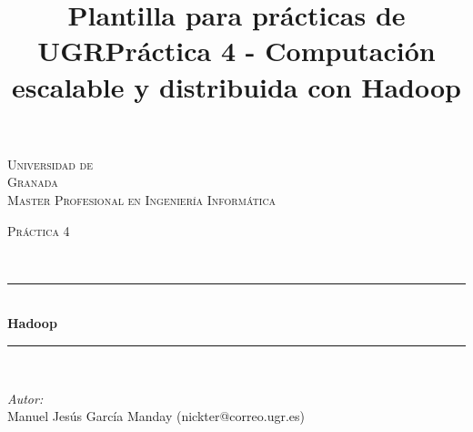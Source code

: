 \documentclass[10pt]{article}
\title{Plantilla para prácticas de UGR}
\title{Práctica 4 - Computación escalable y distribuida con Hadoop}
\begin{document}
\begin{center}																		%
\newcommand{\HRule}{\rule{\linewidth}{0.5mm}}									%
\begin{minipage}{0.48\textwidth} \begin{flushleft}
\end{flushleft}\end{minipage}
\begin{minipage}{0.48\textwidth} \begin{flushright}
\end{flushright}\end{minipage}

\vspace*{-1.5cm}								%
\textsc{\huge Universidad de\\ \vspace{5px} Granada}\\[1.5cm]	

\textsc{\LARGE Master Profesional en Ingenier\'ia Inform\'atica }\\[1.5cm]													%

\begin{minipage}{0.9\textwidth} 
\begin{center}																					%
\textsc{\LARGE Pr\'actica 4}
\end{center}
\end{minipage}\\[0.5cm]
 			\vspace*{1cm}																		%
\HRule \\[0.4cm]																	%
{ \huge \bfseries Hadoop}\\[0.4cm]	%
\HRule \\[1.5cm]																	%
\begin{minipage}{0.46\textwidth}													%
\begin{flushleft} \large															%
\emph{Autor:}\\	
Manuel Jes\'us Garc\'ia Manday (nickter@correo.ugr.es)\\
\end{flushleft}																		%
\end{minipage}		
\begin{minipage}{0.52\textwidth}		
\vspace{-0.6cm}											%
\begin{flushright} \large															%
\end{flushright}																	%
\end{minipage}	
\vspace*{1cm}
 	

\end{center}
\end{document}
